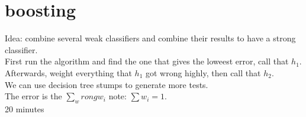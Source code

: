 \documentclass[11pt]{article}
\begin{document}
\section{boosting}
Idea: combine several weak classifiers and combine their results to have a strong classifier. \\
First run the algorithm and find the one that gives the loweest error, call that $h_1$. Afterwards, weight everything that $h_1$ got wrong highly, then call that $h_2$. \\
We can use decision tree stumps to generate more tests. \\
The error is the $\sum_wrong w_i$ note: $\sum w_i = 1$. \\
20 minutes
\end{document}
